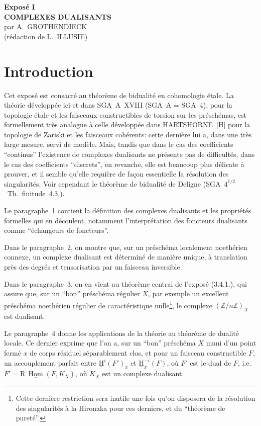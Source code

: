 \documentclass[11pt]{article}
\renewcommand{\H}{\mathrm{H}}
\DeclareMathOperator{\Hom}{Hom}
\newcommand{\R}{\mathrm{R}}\newcommand{\RHomCore}{\mathrm{RHom}}
\newcommand{\Z}{\mathbb{Z}}
\providecommand{\Hom}{\operatorname{Hom}}
\providecommand{\R}{\mathrm R}
\providecommand{\Z}{\mathbb Z}
\providecommand{\Hom}{\operatorname{Hom}}
\begin{document}
\begin{center}
{\Large \textbf{Exposé I}}\\[0.4em]
{\large \textbf{COMPLEXES DUALISANTS}}\\[0.3em]
par A.~GROTHENDIECK\\
(rédaction de L.~ILLUSIE)
\end{center}

\section*{Introduction}

Cet exposé est consacré au théorème de bidualité en cohomologie étale. La théorie développée ici et dans SGA~A~XVIII (SGA~A = SGA~4), pour la topologie étale et les faisceaux constructibles de torsion sur les préschémas, est formellement très analogue à celle développée dans HARTSHORNE~[H] pour la topologie de Zariski et les faisceaux cohérents: cette dernière lui a, dans une très large mesure, servi de modèle. Mais, tandis que dans le cas des coefficients ``continus'' l'existence de complexes dualisants ne présente pas de difficultés, dans le cas des coefficients ``discrets'', en revanche, elle est beaucoup plus délicate à prouver, et il semble qu'elle requière de façon essentielle la résolution des singularités. Voir cependant le théorème de bidualité de Deligne (SGA~$4^{1/2}$~Th.~finitude~4.3.).

Le paragraphe~1 contient la définition des complexes dualisants et les propriétés formelles qui en découlent, notamment l'interprétation des foncteurs dualisants comme ``échangeurs de foncteurs''.

Dans le paragraphe~2, on montre que, sur un préschéma localement noethérien connexe, un complexe dualisant est déterminé de manière unique, à translation près des degrés et tensorisation par un faisceau inversible.

Dans le paragraphe~3, on en vient au théorème central de l'exposé (3.4.1.), qui assure que, sur un ``bon'' préschéma régulier $X$, par exemple un excellent préschéma noethérien régulier de caractéristique nulle\footnote{Cette dernière restriction sera inutile une fois qu'on disposera de la résolution des singularités à la Hironaka pour ces derniers, et du ``théorème de pureté''.}, le complexe $(\Z/n\Z)_X$ est dualisant.

Le paragraphe~4 donne les applications de la théorie au théorème de dualité locale. Ce dernier exprime que l'on a, sur un ``bon'' préschéma $X$ muni d'un point fermé $x$ de corps résiduel séparablement clos, et pour un faisceau constructible $F$, un accouplement parfait entre $\underline{\H}^i(F')_x$ et $\underline{\H}^{-i}_x(F)$, où $F'$ est le dual de $F$, i.e.\ $F' = \R\,\underline{\Hom}(F,K_X)$, où $K_X$ est un complexe dualisant.
\end{document}
